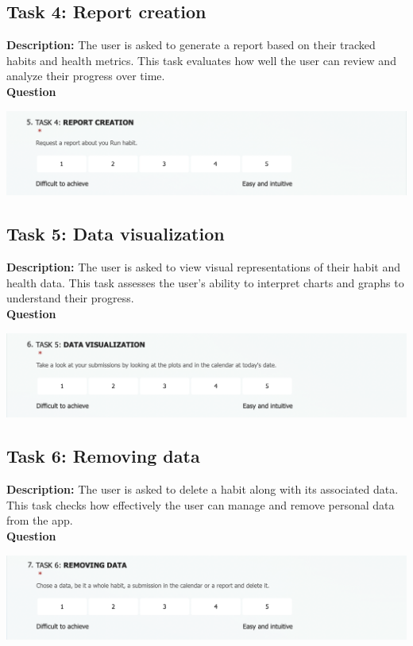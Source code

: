 \documentclass{article}
\newcommand{\newpar}[0]{\vspace{2mm}\noindent}
\newcommand{\ititle}[1]{\newpar\hspace{1em}\textbf{#1}}
\begin{document}
\subsection{Task 4: Report creation}
\ititle{Description:} The user is asked to generate a report based on their tracked habits and health metrics. This task evaluates how well the user can review and analyze their progress over time.
\\
\ititle{Question}
\begin{center}
	\includegraphics[width=\linewidth]{images/report_creation.png}
\end{center}

\subsection{Task 5: Data visualization}
\ititle{Description:} The user is asked to view visual representations of their habit and health data. This task assesses the user's ability to interpret charts and graphs to understand their progress.
\\
\ititle{Question}
\begin{center}
	\includegraphics[width=\linewidth]{images/data_visualization.png}
\end{center}

\subsection{Task 6: Removing data}
\ititle{Description:} The user is asked to delete a habit along with its associated data. This task checks how effectively the user can manage and remove personal data from the app.
\\
\ititle{Question}
\begin{center}
	\includegraphics[width=\linewidth]{images/data_removal.png}
\end{center}
\end{document}
